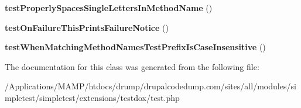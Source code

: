 \begin{DoxyCompactItemize}
\item 
\hypertarget{class_test_of_test_dox_reporter_a51991a0e06cb163623b3fc04a8786e8f}{
{\bfseries testProperlySpacesSingleLettersInMethodName} ()}
\label{class_test_of_test_dox_reporter_a51991a0e06cb163623b3fc04a8786e8f}

\item 
\hypertarget{class_test_of_test_dox_reporter_afd424115206c41828f366992cfe8689c}{
{\bfseries testOnFailureThisPrintsFailureNotice} ()}
\label{class_test_of_test_dox_reporter_afd424115206c41828f366992cfe8689c}

\item 
\hypertarget{class_test_of_test_dox_reporter_ae8d01c023f278444eea9cbe1dae90bf0}{
{\bfseries testWhenMatchingMethodNamesTestPrefixIsCaseInsensitive} ()}
\label{class_test_of_test_dox_reporter_ae8d01c023f278444eea9cbe1dae90bf0}

\end{DoxyCompactItemize}


The documentation for this class was generated from the following file:\begin{DoxyCompactItemize}
\item 
/Applications/MAMP/htdocs/drump/drupalcodedump.com/sites/all/modules/simpletest/simpletest/extensions/testdox/test.php\end{DoxyCompactItemize}

